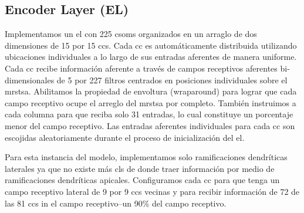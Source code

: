 


\subsection{Encoder Layer (EL)}

Implementamos un \gls{el} con 225 \glspl{csom} organizados en un arraglo de dos dimensiones de 15 por 15 \glspl{cc}.
Cada \gls{cc} es automáticamente distribuida utilizando ubicaciones individuales a lo largo de sus entradas aferentes de manera uniforme.
Cada \gls{cc} recibe información aferente a través de campos receptivos aferentes bi-dimensionales de 5 por 227 filtros centrados en posiciones individuales sobre el \gls{mrstsa}.
Abilitamos la propiedad de envoltura (wraparound) para lograr que cada campo receptivo ocupe el arreglo del \gls{mrstsa} por completo.
También instruimos a cada columna para que reciba solo 31 entradas, lo cual constituye un porcentaje menor del campo receptivo.
Las entradas aferentes individuales para cada \gls{cc} son escojidas aleatoriamente durante el proceso de inicialización del \gls{el}.

Para esta instancia del modelo, implementamos solo ramificaciones dendríticas laterales ya que no existe más \glspl{cl} de donde traer información por medio de ramificaciones dendríticas apicales.
Configuramos cada \gls{cc} para que tenga un campo receptivo lateral de 9 por 9 \glspl{cc} vecinas y para recibir información de 72 de las 81 \glspl{cc} in el campo receptivo--un 90\% del campo receptivo.


